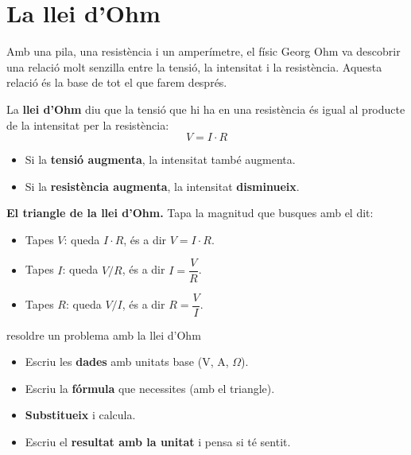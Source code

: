 \section{La llei d'Ohm}

Amb una pila, una resistència i un amperímetre, el físic Georg Ohm va descobrir una relació molt senzilla entre la tensió, la intensitat i la resistència. Aquesta relació és la base de tot el que farem després.

\begin{idea}
La \textbf{llei d'Ohm} diu que la tensió que hi ha en una resistència és igual al producte de la intensitat per la resistència:
\[ V = I \cdot R \]
\begin{itemize}
 \item Si la \textbf{tensió augmenta}, la intensitat també augmenta.
 \item Si la \textbf{resistència augmenta}, la intensitat \textbf{disminueix}.
\end{itemize}
\end{idea}

\begin{center}
\begin{minipage}{0.4\linewidth}\centering
{}
\end{minipage}
\begin{minipage}{0.5\linewidth}
\textbf{El triangle de la llei d'Ohm.} Tapa la magnitud que busques amb el dit:
\begin{itemize}
 \item Tapes $V$: queda $I \cdot R$, és a dir $V = I \cdot R$.
 \item Tapes $I$: queda $V / R$, és a dir $I = \dfrac{V}{R}$.
 \item Tapes $R$: queda $V / I$, és a dir $R = \dfrac{V}{I}$.
\end{itemize}
\end{minipage}
\end{center}

\begin{metode}{resoldre un problema amb la llei d'Ohm}
\begin{itemize}
\item \textbf{} Escriu les \textbf{dades} amb unitats base (V, A, $\Omega$). \quad
\item \textbf{} Escriu la \textbf{fórmula} que necessites (amb el triangle). \quad
\item \textbf{} \textbf{Substitueix} i calcula. \quad
\item \textbf{} Escriu el \textbf{resultat amb la unitat} i pensa si té sentit.
\end{itemize}
\end{metode}

